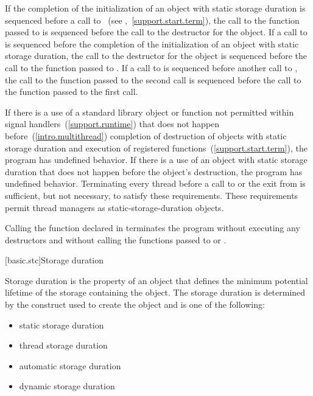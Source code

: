 \pnum
{}%
%
If the completion of the initialization of an object with static storage
duration is sequenced before a call to ~(see
,~\ref{support.start.term}), the call to the function passed to
 is sequenced before the call to the destructor for the object. If a
call to  is sequenced before the completion of the initialization of
an object with static storage duration, the call to the destructor for the
object is sequenced before the call to the function passed to . If a
call to  is sequenced before another call to , the
call to the function passed to the second  call is sequenced before
the call to the function passed to the first  call.

\pnum
If there is a use of a standard library object or function not permitted within signal
handlers~(\ref{support.runtime}) that does not happen before~(\ref{intro.multithread})
completion of destruction of objects with static storage duration and execution of
 registered functions~(\ref{support.start.term}), the program has
undefined behavior. \enternote If there is a use of an object with static storage
duration that does not happen before the object's destruction, the program has undefined
behavior. Terminating every thread before a call to  or the exit from
 is sufficient, but not necessary, to satisfy these requirements. These
requirements permit thread managers as static-storage-duration objects. \exitnote

\pnum
{}%
%
%
Calling the function  declared in
%
 terminates the program without executing any destructors
and without calling
the functions passed to  or .%

[basic.stc]{Storage duration}

\pnum
{}%
Storage duration is the property of an object that defines the minimum
potential lifetime of the storage containing the object. The storage
duration is determined by the construct used to create the object and is
one of the following:

\begin{itemize}
\item static storage duration
\item thread storage duration
\item automatic storage duration
\item dynamic storage duration
\end{itemize}

